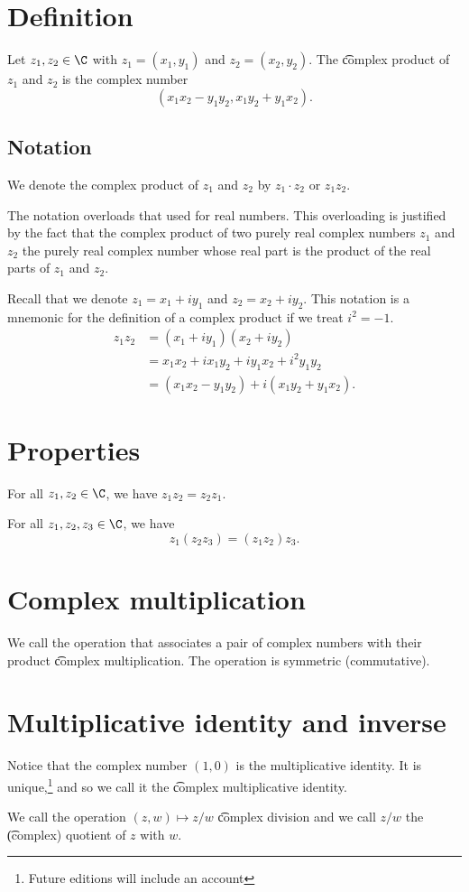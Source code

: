 

\section*{Definition}

Let $z_1, z_2 \in \C $ with $z_1 = (x_1, y_1)$ and $z_2 = (x_2, y_2)$.
The \t{complex product} of $z_1$ and $z_2$ is the complex number
    \[
(x_1x_2 - y_1y_2, x_1y_2 + y_1x_2).
    \]

\subsection*{Notation}

We denote the complex product of $z_1$ and $z_2$ by $z_1 \cdot  z_2$ or $z_1z_2$.

The notation overloads that used for real numbers.
This overloading is justified by the fact that the complex product of two purely real complex numbers $z_1$ and $z_2$ the purely real complex number whose real part is the product of the real parts of $z_1$ and $z_2$.

Recall that we denote $z_1 = x_1 + iy_1$ and $z_2 = x_2 + iy_2$.
This notation is a mnemonic for the definition of a complex product if we treat $i^2 = -1$.
    \[
\begin{aligned}
z_1z_2 &= (x_1 + iy_1)(x_2 + iy_2) \\
&= x_1x_2 + ix_1y_2 + iy_1x_2 + i^2 y_1y_2 \\
&= (x_1x_2 - y_1y_2) + i(x_1y_2 + y_1x_2).
\end{aligned}
    \]

\section*{Properties}

\begin{proposition}[Commutativity]
For all $z_1, z_2 \in \C $, we have $z_1z_2 = z_2z_1$.\end{proposition}
\begin{proposition}[Associativity]
For all $z_1, z_2, z_3 \in \C $, we have
  \[
z_1(z_2z_3) = (z_1z_2)z_3.
  \]\end{proposition}
\section*{Complex multiplication}

We call the operation that associates a pair of complex numbers with their product \t{complex multiplication}.
The operation is symmetric (commutative).

\section*{Multiplicative identity and inverse}

Notice that the complex number $(1, 0)$ is the multiplicative identity.
It is unique,\footnote{Future editions will include an account}
and so we call it the \t{complex multiplicative identity.}

We call the operation $(z, w) \mapsto z/w$ \t{complex division} and we call $z/w$ the \t{(complex) quotient} of $z$ with $w$.
